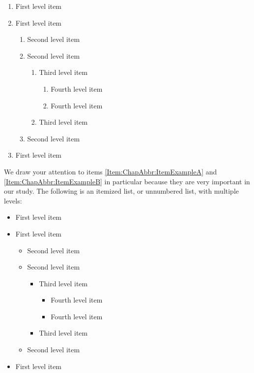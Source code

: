 \begin{enumerate}
\item
\label{Item:ChapAbbr:ItemExampleA}
First level item
\item
First level item
\begin{enumerate}
\item
Second level item
\item
Second level item
\begin{enumerate}
\item
Third level item
\begin{enumerate}
\item
Fourth level item
\item
Fourth level item
\end{enumerate}
\item
Third level item
\end{enumerate}
\item
Second level item
\end{enumerate}
\item
\label{Item:ChapAbbr:ItemExampleB}
First level item
\end{enumerate}

We draw your attention to items \ref{Item:ChapAbbr:ItemExampleA} and \ref{Item:ChapAbbr:ItemExampleB} in particular because they are very important in our study.
The following is an itemized list, or unnumbered list, with multiple levels:

\begin{itemize}
\item
First level item
\item
First level item
\begin{itemize}
\item
Second level item
\item
Second level item
\begin{itemize}
\item
Third level item
\begin{itemize}
\item
Fourth level item
\item
Fourth level item
\end{itemize}
\item
Third level item
\end{itemize}
\item
Second level item
\end{itemize}
\item
First level item
\end{itemize}

